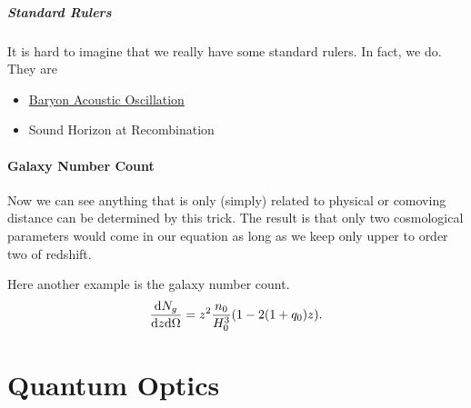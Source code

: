 \documentclass[letterpaper,10pt,english]{sphinxmanual}
\begin{document}
\subparagraph{Standard Rulers}
\label{Cosmology/cosmoIndex:standard-rulers}
It is hard to imagine that we really have some standard rulers. In fact, we do. They are
\begin{itemize}
\item {} 
\href{https://en.wikipedia.org/wiki/Baryon\_acoustic\_oscillations}{Baryon Acoustic Oscillation}

\item {} 
Sound Horizon at Recombination

\end{itemize}


\paragraph{Galaxy Number Count}
\label{Cosmology/cosmoIndex:galaxy-number-count}
Now we can see anything that is only (simply) related to physical or comoving distance can be determined by this trick. The result is that only two cosmological parameters would come in our equation as long as we keep only upper to order two of redshift.

Here another example is the galaxy number count.
\begin{gather}
\begin{split}\frac{\mathrm d N_g}{\mathrm d z \mathrm d\Omega} = z^2 \frac{n_0}{H_0^3}  (1-2(1+q_0) z) .\end{split}\notag
\end{gather}

\section{Quantum Optics}
\label{Quantum/QuantumOptics:quantum-optics}\label{Quantum/QuantumOptics::doc}
\end{document}

